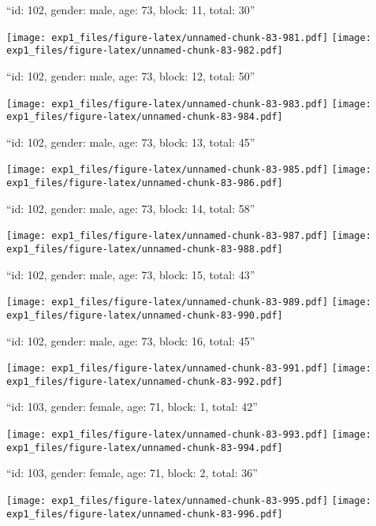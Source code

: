 \documentclass[11pt,,]{article}
\begin{document}
\newpage
[1] 

``id: 102, gender: male, age: 73, block: 11, total: 30''

\texttt{[image: exp1\_files/figure-latex/unnamed-chunk-83-981.pdf]}
\texttt{[image: exp1\_files/figure-latex/unnamed-chunk-83-982.pdf]}

\newpage
[1] 

``id: 102, gender: male, age: 73, block: 12, total: 50''

\texttt{[image: exp1\_files/figure-latex/unnamed-chunk-83-983.pdf]}
\texttt{[image: exp1\_files/figure-latex/unnamed-chunk-83-984.pdf]}

\newpage
[1] 

``id: 102, gender: male, age: 73, block: 13, total: 45''

\texttt{[image: exp1\_files/figure-latex/unnamed-chunk-83-985.pdf]}
\texttt{[image: exp1\_files/figure-latex/unnamed-chunk-83-986.pdf]}

\newpage
[1] 

``id: 102, gender: male, age: 73, block: 14, total: 58''

\texttt{[image: exp1\_files/figure-latex/unnamed-chunk-83-987.pdf]}
\texttt{[image: exp1\_files/figure-latex/unnamed-chunk-83-988.pdf]}

\newpage
[1] 

``id: 102, gender: male, age: 73, block: 15, total: 43''

\texttt{[image: exp1\_files/figure-latex/unnamed-chunk-83-989.pdf]}
\texttt{[image: exp1\_files/figure-latex/unnamed-chunk-83-990.pdf]}

\newpage
[1] 

``id: 102, gender: male, age: 73, block: 16, total: 45''

\texttt{[image: exp1\_files/figure-latex/unnamed-chunk-83-991.pdf]}
\texttt{[image: exp1\_files/figure-latex/unnamed-chunk-83-992.pdf]}

\newpage
[1] 

``id: 103, gender: female, age: 71, block: 1, total: 42''

\texttt{[image: exp1\_files/figure-latex/unnamed-chunk-83-993.pdf]}
\texttt{[image: exp1\_files/figure-latex/unnamed-chunk-83-994.pdf]}

\newpage
[1] 

``id: 103, gender: female, age: 71, block: 2, total: 36''

\texttt{[image: exp1\_files/figure-latex/unnamed-chunk-83-995.pdf]}
\texttt{[image: exp1\_files/figure-latex/unnamed-chunk-83-996.pdf]}
\end{document}
